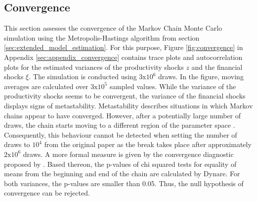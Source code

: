

\subsection{Convergence}
\label{sec:convergence}

This section assesses the convergence of the Markov Chain Monte Carlo simulation using the Metropolis-Hastings algorithm from section \ref{sec:extended_model_estimation}. For this purpose, Figure \ref{fig:convergence} in Appendix \ref{sec:appendix_convergence} contains trace plots and autocorrelation plots for the estimated variances of the productivity shocks $z$ and the financial shocks $\xi$. The simulation is conducted using $3\text{x}10^{6}$ draws. In the figure, moving averages are calculated over $3\text{x}10^{5}$ sampled values. While the variance of the productivity shocks seems to be convergent, the variance of the financial shocks displays signs of metastability. Metastability describes situations in which Markov chains appear to have converged. However, after a potentially large number of draws, the chain starts moving to a different region of the parameter space \citep{PATILpymc}. Consequently, this behaviour cannot be detected when setting the number of draws to $10^{4}$ from the original paper as the break takes place after approximately $2\text{x}10^{6}$ draws. A more formal measure is given by the convergence diagnostic proposed by \cite{GEWEKEevaluating}. Based thereon, the p-values of chi squared tests for equality of means from the beginning and end of the chain are calculated by Dynare. For both variances, the p-values are smaller than 0.05. Thus, the null hypothesis of convergence can be rejected.

